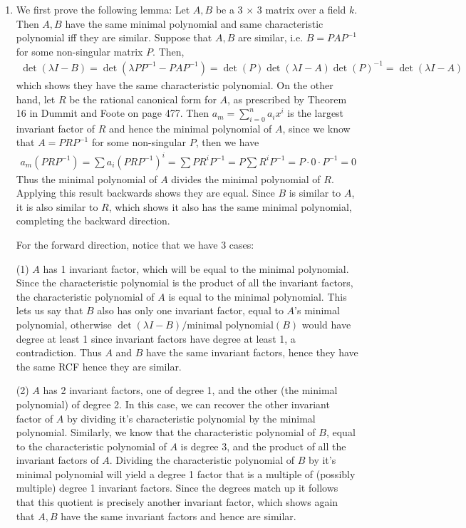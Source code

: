 \documentclass[12pt]{article}
\theoremstyle{definitionstyle}
\begin{document}
\begin{enumerate}
		\item We first prove the following lemma:
		Let $A, B$ be a 3 $\times$ 3 matrix over a field $k$. Then $A,B$ have the same minimal polynomial and same characteristic polynomial iff they are similar. Suppose that $A,B$ are similar, i.e. $B = PAP^{-1}$ for some non-singular matrix $P$. Then,
		\begin{align*}
			\det(\lambda I - B) = \det(\lambda PP^{-1} - PAP^{-1}) = \det(P)\det(\lambda I - A)\det(P)^{-1} = \det(\lambda I - A)
		\end{align*}
		which shows they have the same characteristic polynomial. On the other hand, let $R$ be the rational canonical form for $A$, as prescribed by Theorem 16 in Dummit and Foote on page 477. Then $a_m = \sum_{i=0}^{n} a_ix^i$ is the largest invariant factor of $R$ and hence the minimal polynomial of $A$, since we know that $A = PRP^{-1}$ for some non-singular $P$, then we have
		\begin{align*}
			a_m(PRP^{-1}) = \sum a_i(PRP^{-1})^i = \sum PR^iP^{-1} = P\sum R^i P^{-1} = P \cdot 0 \cdot P^{-1} = 0
		\end{align*}
		Thus the minimal polynomial of $A$ divides the minimal polynomial of $R$. Applying this result backwards shows they are equal. Since $B$ is similar to $A$, it is also similar to $R$, which shows it also has the same minimal polynomial, completing the backward direction.
		
		For the forward direction, notice that we have 3 cases:
		
		(1) $A$ has 1 invariant factor, which will be equal to the minimal polynomial. Since the characteristic polynomial is the product of all the invariant factors, the characteristic polynomial of $A$ is equal to the minimal polynomial. This lets us say that $B$ also has only one invariant factor, equal to $A$'s minimal polynomial, otherwise $\det(\lambda I - B)/\text{minimal polynomial}(B)$ would have degree at least 1 since invariant factors have degree at least 1, a contradiction. Thus $A$ and $B$ have the same invariant factors, hence they have the same RCF hence they are similar.
		
		(2) $A$ has 2 invariant factors, one of degree 1, and the other (the minimal polynomial) of degree 2. In this case, we can recover the other invariant factor of $A$ by dividing it's characteristic polynomial by the minimal polynomial. Similarly, we know that the characteristic polynomial of $B$, equal to the characteristic polynomial of $A$ is degree 3, and the product of all the invariant factors of $A$. Dividing the characteristic polynomial of $B$ by it's minimal polynomial will yield a degree 1 factor that is a multiple of (possibly multiple) degree 1 invariant factors. Since the degrees match up it follows that this quotient is precisely another invariant factor, which shows again that $A,B$ have the same invariant factors and hence are similar.
		

\end{enumerate}
\end{document}
